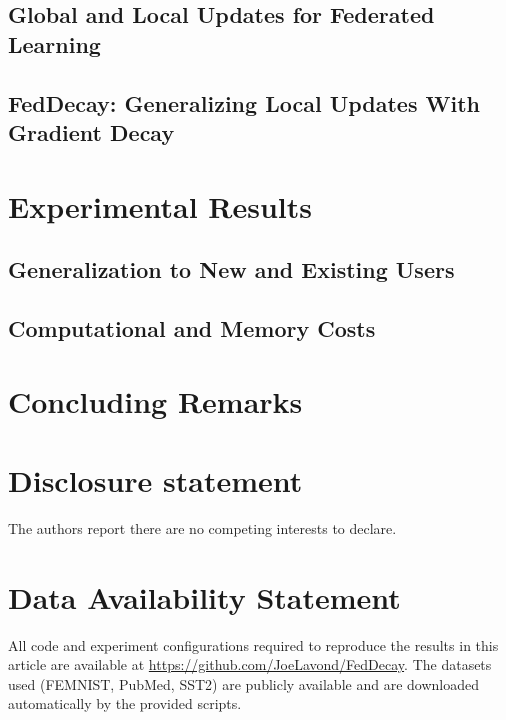 \documentclass[12pt]{article}
\begin{document}
        \subsection{Global and Local Updates for Federated Learning}
        \label{sec: decay-method-updates}
        

        \subsection{FedDecay: Generalizing Local Updates With Gradient Decay}
        \label{sec: decay-method-decay}
        

    \section{Experimental Results}
    \label{sec: decay-exp}
    

        \subsection{Generalization to New and Existing Users}
        \label{sec: decay-exp-gen}
        

        \subsection{Computational and Memory Costs}
        \label{sec: decay-exp-costs}
        

    \section{Concluding Remarks}
    \label{decay-conclusion}
    

    \section*{Disclosure statement}
    The authors report there are no competing interests to declare.

    \section*{Data Availability Statement}
    All code and experiment configurations required to reproduce the results in this
    article are available at \url{https://github.com/JoeLavond/FedDecay}.
    The datasets used (FEMNIST, PubMed, SST2) are publicly available and are
    downloaded automatically by the provided scripts.
\end{document}

